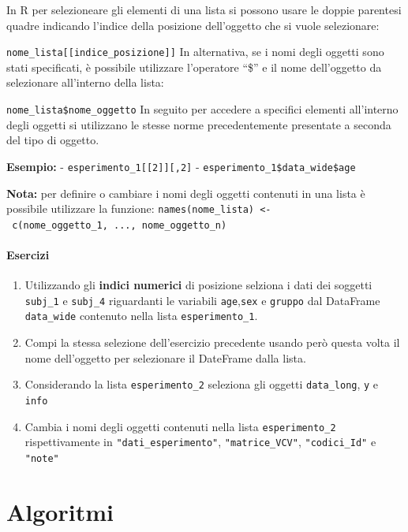 \documentclass[
]{book}
\providecommand{\tightlist}{%
  \setlength{\itemsep}{0pt}\setlength{\parskip}{0pt}}
\begin{document}
In R per selezioneare gli elementi di una lista si possono usare le doppie parentesi quadre indicando l'indice della posizione dell'oggetto che si vuole selezionare:

\texttt{nome\_lista{[}{[}indice\_posizione{]}{]}}
In alternativa, se i nomi degli oggetti sono stati specificati, è possibile utilizzare l'operatore ``\$'' e il nome dell'oggetto da selezionare all'interno della lista:

\texttt{nome\_lista\$nome\_oggetto}
In seguito per accedere a specifici elementi all'interno degli oggetti si utilizzano le stesse norme precedentemente presentate a seconda del tipo di oggetto.

\textbf{Esempio:}
- \texttt{esperimento\_1{[}{[}2{]}{]}{[},2{]}}
- \texttt{esperimento\_1\$data\_wide\$age}

\textbf{Nota:} per definire o cambiare i nomi degli oggetti contenuti in una lista è possibile utilizzare la funzione: \texttt{names(nome\_lista)\ \textless{}-\ c(nome\_oggetto\_1,\ ...,\ nome\_oggetto\_n)}

\hypertarget{esercizi-11}{%
\subsection*{Esercizi}\label{esercizi-11}}

\begin{enumerate}
\def\labelenumi{\arabic{enumi}.}
\tightlist
\item
  Utilizzando gli \textbf{indici numerici} di posizione selziona i dati dei soggetti \texttt{subj\_1} e \texttt{subj\_4} riguardanti le variabili \texttt{age},\texttt{sex} e \texttt{gruppo} dal DataFrame \texttt{data\_wide} contenuto nella lista \texttt{esperimento\_1}.
\item
  Compi la stessa selezione dell'esercizio precedente usando però questa volta il nome dell'oggetto per selezionare il DateFrame dalla lista.
\item
  Considerando la lista \texttt{esperimento\_2} seleziona gli oggetti \texttt{data\_long}, \texttt{y} e \texttt{info}
\item
  Cambia i nomi degli oggetti contenuti nella lista \texttt{esperimento\_2} rispettivamente in \texttt{"dati\_esperimento"}, \texttt{"matrice\_VCV"}, \texttt{"codici\_Id"} e \texttt{"note"}
\end{enumerate}

\hypertarget{part-algoritmi}{%
\part*{Algoritmi}\label{part-algoritmi}}
\end{document}
